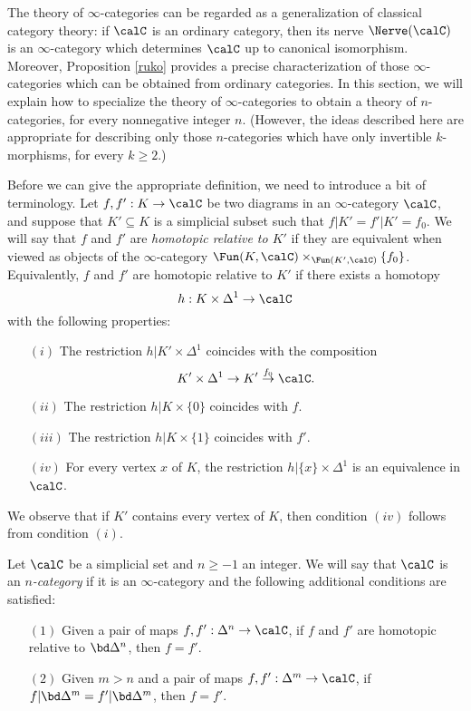 The theory of $\infty$-categories can be regarded as a generalization of classical category theory: 
if $\calC$ is an ordinary category, then its nerve $\Nerve(\calC)$ is an $\infty$-category which determines $\calC$ up to canonical isomorphism. Moreover, Proposition \ref{ruko} provides a precise characterization of those $\infty$-categories which can be obtained from ordinary categories. In this section, we will explain how to specialize the theory of $\infty$-categories to obtain a theory of $n$-categories, for every nonnegative integer $n$. (However, the ideas described here are appropriate for describing only those $n$-categories which have only invertible $k$-morphisms, for every $k \geq 2$.) 

Before we can give the appropriate definition, we need to introduce a bit of terminology.
Let $f,f': K \rightarrow \calC$ be two diagrams in an $\infty$-category $\calC$, and suppose
that $K' \subseteq K$ is a simplicial subset such that $f | K' = f'| K' = f_0$. We will say that
$f$ and $f'$ are {\it homotopic relative to $K'$} if they are equivalent when viewed as objects of the $\infty$-category $\Fun(K,\calC) \times_{ \Fun(K',\calC)} \{ f_0\}$. Equivalently, $f$ and $f'$
are homotopic relative to $K'$ if there exists a homotopy
$$ h: K \times \Delta^1 \rightarrow \calC$$
with the following properties:
\begin{itemize}
\item[$(i)$] The restriction $h | K' \times \Delta^1$ coincides with the composition
$$ K' \times \Delta^1 \rightarrow K' \stackrel{ f_0 }{\rightarrow} \calC. $$
\item[$(ii)$] The restriction $h | K \times \{0\}$ coincides with $f$.
\item[$(iii)$] The restriction $h | K \times \{1\}$ coincides with $f'$.
\item[$(iv)$] For every vertex $x$ of $K$, the restriction
$h | \{x\} \times \Delta^1$ is an equivalence in $\calC$.
\end{itemize}

We observe that if $K'$ contains every vertex of $K$, then condition $(iv)$ follows from condition $(i)$.

\begin{definition}\label{ncat}
Let $\calC$ be a simplicial set and $n \geq -1$ an integer. We will say that
$\calC$ is an {\it $n$-category} if it is an $\infty$-category and the following additional conditions are satisfied:
\begin{itemize}
\item[$(1)$] Given a pair of maps $f, f': \Delta^n \rightarrow \calC$, if
$f$ and $f'$ are homotopic relative to $\bd \Delta^n$, then $f = f'$.

\item[$(2)$] Given $m > n$ and a pair of maps $f,f': \Delta^m \rightarrow \calC$, if
$f | \bd \Delta^m = f' | \bd \Delta^m$, then $f = f'$.

\end{itemize}
\end{definition}

